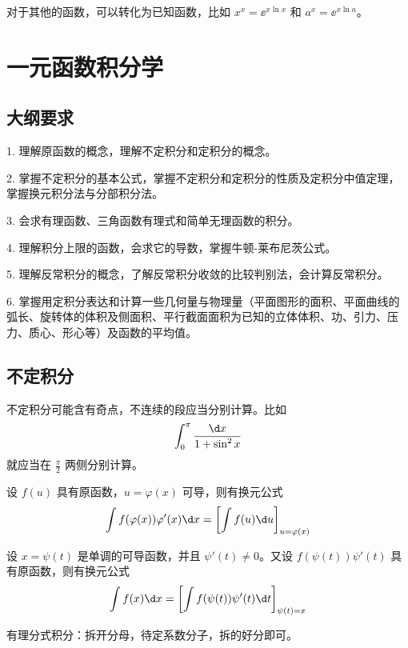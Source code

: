 对于其他的函数，可以转化为已知函数，比如 $x^x = \ee^{x \ln x}$ 和 $a^x = \ee^{x \ln a}$。

\section{一元函数积分学}

\subsection{大纲要求}

1. 理解原函数的概念，理解不定积分和定积分的概念。

2. 掌握不定积分的基本公式，掌握不定积分和定积分的性质及定积分中值定理，掌握换元积分法与分部积分法。

3. 会求有理函数、三角函数有理式和简单无理函数的积分。

4. 理解积分上限的函数，会求它的导数，掌握牛顿-莱布尼茨公式。

5. 理解反常积分的概念，了解反常积分收敛的比较判别法，会计算反常积分。

6. 掌握用定积分表达和计算一些几何量与物理量（平面图形的面积、平面曲线的弧长、旋转体的体积及侧面积、平行截面面积为已知的立体体积、功、引力、压力、质心、形心等）及函数的平均值。

\subsection{不定积分}

\begin{note}
	不定积分可能含有奇点，不连续的段应当分别计算。比如
	\[ \int_{0}^{\pi} \frac{\d x}{1 + \sin^2 x} \]
	就应当在 $\frac{\pi}{2}$ 两侧分别计算。
\end{note}

\begin{theorem}[第一类换元积分法]
	设 $f(u)$ 具有原函数，$u = \varphi(x)$ 可导，则有换元公式
	\[ \int f(\varphi(x)) \varphi'(x) \d x = \left[\int f(u) \d u \right]_{u = \varphi(x)} \]
\end{theorem}

\begin{theorem}[第二类换元积分法]
	设 $x = \psi(t)$ 是单调的可导函数，并且 $\psi'(t) \neq 0$。又设 $f(\psi(t)) \psi'(t)$ 具有原函数，则有换元公式
	\[ \int f(x) \d x = \left[ \int f(\psi(t))\psi'(t) \d t \right]_{\psi(t) = x} \]
\end{theorem}

有理分式积分：拆开分母，待定系数分子，拆的好分即可。

